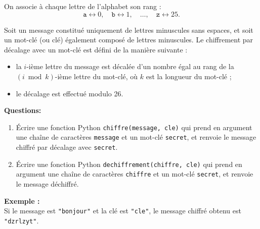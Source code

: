 \documentclass[a4paper,11pt]{article}
\begin{document}
On associe à chaque lettre de l’alphabet son rang :
\[
\texttt{a} \leftrightarrow 0,\quad \texttt{b} \leftrightarrow 1,\quad \ldots,\quad \texttt{z} \leftrightarrow 25.
\]

Soit un message constitué uniquement de lettres minuscules sans espaces, et soit un mot-clé (ou clé) également composé de lettres minuscules.
Le chiffrement par décalage avec un mot-clé est défini de la manière suivante :
\begin{itemize}
    \item la $i$-ième lettre du message est décalée d’un nombre égal au rang de la $(i \bmod k)$-ième lettre du mot-clé, où $k$ est la longueur du mot-clé ;
    \item le décalage est effectué modulo 26.
\end{itemize}

\textbf{Questions:}

\begin{enumerate}
       
    \item[1.] Écrire une fonction Python \texttt{chiffre(message, cle)} qui prend en argument une chaîne de caractères \texttt{message} et un mot-clé \texttt{secret}, et renvoie le message chiffré par décalage avec \texttt{secret}.
    
       \item[2. ] Écrire une fonction Python \texttt{dechiffrement(chiffre, cle)} qui prend en argument une chaîne de caractères \texttt{chiffre} et un mot-clé \texttt{secret}, et renvoie le message déchiffré. 

\end{enumerate}

\bigskip

\noindent
\textbf{Exemple :} \\
Si le message est \texttt{"bonjour"} et la clé est \texttt{"cle"}, le message chiffré obtenu est \texttt{"dzrlzyt"}.
\end{document}
